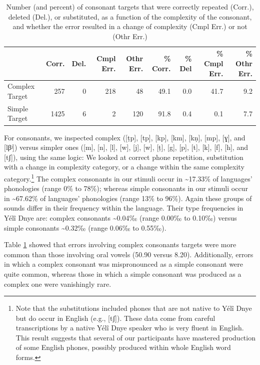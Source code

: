 \documentclass[english,,man,floatsintext]{apa6}
\begin{document}
\begin{table}

\caption{\label{tab:tab-c}Number (and percent) of consonant targets that were correctly repeated (Corr.), deleted (Del.), or substituted, as a function of the complexity of the consonant, and whether the error resulted in a change of complexity (Cmpl Err.) or not (Othr Err.)}
\centering
\begin{tabular}[t]{lrrrrrrrr}
\toprule
  & Corr. & Del. & Cmpl Err. & Othr Err. & \% Corr. & \% Del & \% Cmpl Err. & \% Othr Err.\\
\midrule
Complex Target & 257 & 0 & 218 & 48 & 49.1 & 0.0 & 41.7 & 9.2\\
Simple Target & 1425 & 6 & 2 & 120 & 91.8 & 0.4 & 0.1 & 7.7\\
\bottomrule
\end{tabular}
\end{table}

For consonants, we inspected complex ({[}ṭp{]}, {[}tp{]}, {[}kp{]}, {[}km{]}, {[}kṇ{]}, {[}mp{]}, {[}ɣ{]}, and {[}lβʲ{]}) versus simpler ones ({[}m{]}, {[}n{]}, {[}l{]}, {[}w{]}, {[}j{]}, {[}w{]}, {[}ṭ{]}, {[}g{]}, {[}p{]}, {[}t{]}, {[}k{]}, {[}f{]}, {[}h{]}, and {[}tʃ{]}), using the same logic: We looked at correct phone repetition, substitution with a change in complexity category, or a change within the same complexity category.\footnote{Note that the substitutions included phones that are not native to Yélî Dnye but do occur in English (e.g., {[}tʃ{]}). These data come from careful transcriptions by a native Yélî Dnye speaker who is very fluent in English. This result suggests that several of our participants have mastered production of some English phones, possibly produced within whole English word forms.}
The complex consonants in our stimuli occur in \textasciitilde{}17.33\% of languages' phonologies (range 0\% to 78\%);
whereas simple consonants in our stimuli occur in \textasciitilde{}67.62\% of languages' phonologies (range 13\% to 96\%).
Again these groups of sounds differ in their frequency within the language. Their type frequencies in Yélî Dnye are: complex consonants \textasciitilde{}0.04‰ (range 0.00‰ to 0.10‰) versus simple consonants \textasciitilde{}0.32‰ (range 0.06‰ to 0.55‰).

Table \ref{tab:tab-c} showed that errors involving complex consonants targets were more common than those involving oral vowels (50.90 versus 8.20). Additionally, errors in which a complex consonant was mispronounced as a simple consonant were quite common, whereas those in which a simple consonant was produced as a complex one were vanishingly rare.
\end{document}
